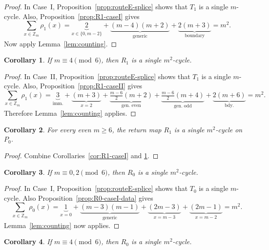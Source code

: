 \documentclass[11pt]{article}
\newtheorem{corollary}{Corollary}
\newcommand{\Zm}{\mathbb Z_m}
\begin{document}
\begin{proof}
In Case~I, Proposition~\ref{prop:routeE-splice} shows that $T_1$ is a single $m$-cycle.
Also, Proposition~\ref{prop:R1-caseI} gives
\[
\sum_{x\in \Zm}\rho_1(x)=\underbrace{2}_{x\in\{0,m{-}2\}}+\underbrace{(m-4)(m+2)}_{\text{generic}}+\underbrace{2(m+3)}_{\text{boundary}}=m^2.
\]
Now apply Lemma~\ref{lem:counting}.
\end{proof}

\begin{corollary}\label{cor:R1-caseII}
If $m\equiv 4\pmod 6$, then $R_1$ is a single $m^2$-cycle.
\end{corollary}

\begin{proof}
In Case~II, Proposition~\ref{prop:routeE-splice} shows that $T_1$ is a single $m$-cycle.
Also, Proposition~\ref{prop:R1-caseII} gives
\[
\sum_{x\in \Zm}\rho_1(x)
=
\underbrace{3}_{\text{imm.}}+\underbrace{(m+3)}_{x=2}+\underbrace{\tfrac{m-6}{2}(m+2)}_{\text{gen.\ even}}+\underbrace{\tfrac{m-6}{2}(m+4)}_{\text{gen.\ odd}}+\underbrace{2(m+6)}_{\text{bdy.}}=m^2.
\]
Therefore Lemma~\ref{lem:counting} applies.
\end{proof}

\begin{corollary}\label{cor:R1-all}
For every even $m\ge 6$, the return map $R_1$ is a single $m^2$-cycle on $P_0$.
\end{corollary}

\begin{proof}
Combine Corollaries~\ref{cor:R1-caseI} and \ref{cor:R1-caseII}.
\end{proof}

\begin{corollary}\label{cor:R0-caseI}
If $m\equiv 0,2\pmod 6$, then $R_0$ is a single $m^2$-cycle.
\end{corollary}

\begin{proof}
In Case~I, Proposition~\ref{prop:routeE-splice} shows that $T_0$ is a single $m$-cycle.
Also Proposition~\ref{prop:R0-caseI-data} gives
\[
\sum_{x\in \Zm}\rho_0(x)=\underbrace{1}_{x=0}+\underbrace{(m-3)(m-1)}_{\text{generic}}+\underbrace{(2m-3)}_{x=m{-}3}+\underbrace{(2m-1)}_{x=m{-}2}=m^2.
\]
Lemma~\ref{lem:counting} now applies.
\end{proof}

\begin{corollary}\label{cor:R0-caseII}
If $m\equiv 4\pmod 6$, then $R_0$ is a single $m^2$-cycle.
\end{corollary}
\end{document}
